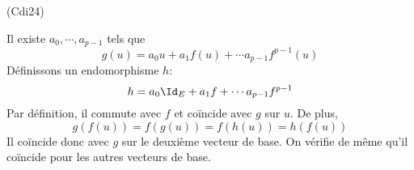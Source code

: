 \begin{tiny}(Cdi24)\end{tiny} Il existe $a_0,\cdots,a_{p-1}$ tels que
\begin{displaymath}
  g(u) = a_0 u +a_1f(u) + \cdots a_{p-1}f^{p-1}(u)
\end{displaymath}
Définissons un endomorphisme $h$:
\begin{displaymath}
  h = a_0 \Id_E + a_1f + \cdots a_{p-1}f^{p-1}
\end{displaymath}
Par définition, il commute avec $f$ et coïncide avec $g$ sur $u$. De plus,
\begin{displaymath}
  g(f(u))=f(g(u))=f(h(u))=h(f(u))
\end{displaymath}
Il coïncide donc avec $g$ sur le deuxième vecteur de base. On vérifie de même qu'il coïncide pour les autres vecteurs de base.
